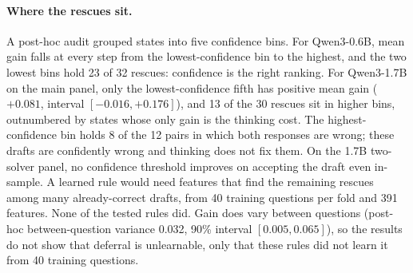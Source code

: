 \documentclass[10pt,letterpaper]{article}
\begin{document}
\paragraph{Where the rescues sit.} A post-hoc audit grouped states into five confidence bins. For Qwen3-0.6B, mean gain falls at every step from the lowest-confidence bin to the highest, and the two lowest bins hold 23 of 32 rescues: confidence is the right ranking. For Qwen3-1.7B on the main panel, only the lowest-confidence fifth has positive mean gain ($+0.081$, interval $[-0.016, +0.176]$), and 13 of the 30 rescues sit in higher bins, outnumbered by states whose only gain is the thinking cost. The highest-confidence bin holds 8 of the 12 pairs in which both responses are wrong; these drafts are confidently wrong and thinking does not fix them. On the 1.7B two-solver panel, no confidence threshold improves on accepting the draft even in-sample. A learned rule would need features that find the remaining rescues among many already-correct drafts, from 40 training questions per fold and 391 features. None of the tested rules did. Gain does vary between questions (post-hoc between-question variance 0.032, 90\% interval $[0.005, 0.065]$), so the results do not show that deferral is unlearnable, only that these rules did not learn it from 40 training questions.
\end{document}
